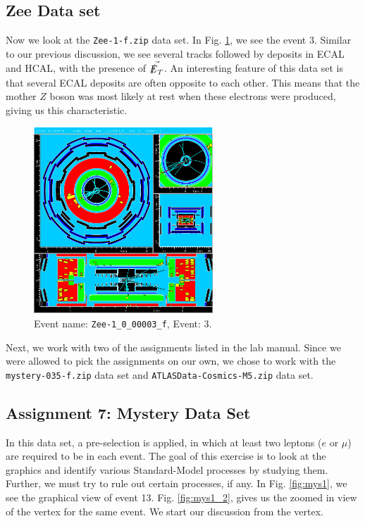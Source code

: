 \documentclass[a4paper]{report}
\numberwithin{equation}{section}
\begin{document}
\subsection{Zee Data set}

Now we look at the \texttt{Zee-1-f.zip} data set. In Fig. \ref{fig:zee}, we see the event 3. Similar to our previous discussion, we see several tracks followed by deposits in ECAL and HCAL, with the presence of $\vec{\slashed{E}_T}$. An interesting feature of this data set is that several ECAL deposits are often opposite to each other. This means that the mother $Z$ boson was most likely at rest when these electrons were produced, giving us this characteristic. 

\begin{figure}[htpb]
    \centering
    \includegraphics[width=0.6\textwidth]{Zee-1_0_00003_f-YX-RZ-RZ-YX-2022-05-23-13-23-32}
    \caption{Event name: \texttt{Zee-1\_0\_00003\_f}, Event: 3.}
    \label{fig:zee}
\end{figure}


Next, we work with two of the assignments listed in the lab manual. Since we were allowed to pick the assignments on our own, we chose to work with the \texttt{mystery-035-f.zip} data set and \texttt{ATLASData-Cosmics-M5.zip} data set. 

\subsection{Assignment 7: Mystery Data Set}  \label{subsec:mystery}
In this data set, a pre-selection is applied, in which at least two leptons ($e$ or $\mu$) are required to be in each event. The goal of this exercise is to look at the graphics and identify various Standard-Model processes by studying them. Further, we must try to rule out certain processes, if any. In Fig. \ref{fig:mys1}, we see the graphical view of event 13. Fig. \ref{fig:mys1_2}, gives us the zoomed in view of the vertex for the same event. We start our discussion from the vertex. 
\end{document}
